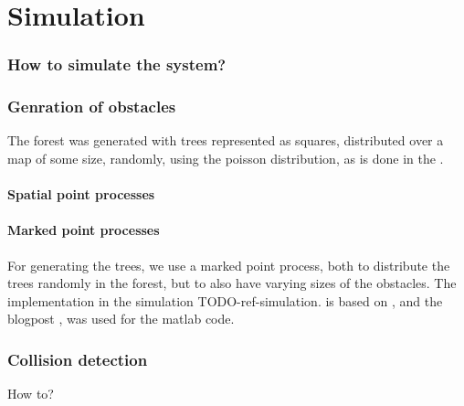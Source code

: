 \chapter{Simulation}

\subsection{How to simulate the system?}

\subsection{Genration of obstacles}

The forest was generated with trees represented as squares, distributed over a
map of some size, randomly, using the poisson distribution, as is done in the
\cite{majumdarFunnelLibrariesRealtime2017}. 

\subsubsection{Spatial point processes}

\subsubsection{Marked point processes}

For generating the trees, we use a marked point process, both to distribute the
trees randomly in the forest, but to also have varying sizes of the obstacles.
The implementation in the simulation TODO-ref-simulation. is based on
\cite{kroeseSpatialProcessGeneration}, and the blogpost \cite{zotero-187}, was
used for the matlab code.

\subsection{Collision detection}

How to?